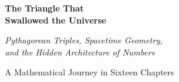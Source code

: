 \documentclass[11pt,a4paper,openany]{book}
\begin{document}
\begin{titlepage}
\centering
\vspace*{2cm}
{\Huge\bfseries\color{chaptercolor} The Triangle That\\[0.3cm] Swallowed the Universe\par}
\vspace{1.5cm}
{\Large\itshape Pythagorean Triples, Spacetime Geometry,\\[0.2cm] and the Hidden Architecture of Numbers\par}
\vspace{3cm}
{\large A Mathematical Journey in Sixteen Chapters\par}
\vfill
\vspace{1cm}
\end{titlepage}

\frontmatter
\tableofcontents
\clearpage

\mainmatter




















\backmatter
\end{document}

